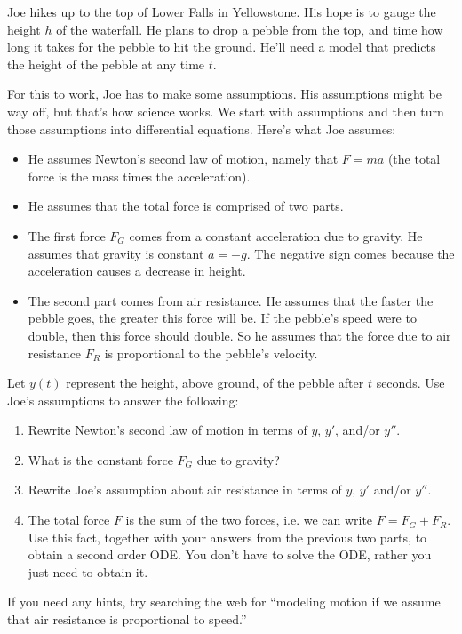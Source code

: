 \begin{problem}\label{pebble from falls}
 Joe hikes up to the top of Lower Falls in Yellowstone.  His hope is to gauge the height $h$ of the waterfall.  He plans to drop a pebble from the top, and time how long it takes for the pebble to hit the ground. He'll need a model that predicts the height of the pebble at any time $t$.

 For this to work, Joe has to make some assumptions.  His assumptions might be way off, but that's how science works. We start with assumptions and then turn those assumptions into differential equations. Here's what Joe assumes:
\begin{itemize}
 \item He assumes Newton's second law of motion, namely that $F=ma$ (the total force is the mass times the acceleration).
 \item He assumes that the total force is comprised of two parts.  
 \item The first force $F_G$ comes from a constant acceleration due to gravity. He assumes that gravity is constant $a=-g$. The negative sign comes because the acceleration causes a decrease in height.
 \item The second part comes from air resistance. He assumes that the faster the pebble goes, the greater this force will be. If the pebble's speed were to double, then this force should double.  So he assumes that the force due to air resistance $F_R$ is proportional to the pebble's velocity.
\end{itemize}
Let $y(t)$ represent the height, above ground, of the pebble after $t$ seconds. Use Joe's assumptions to answer the following:
\begin{enumerate}
 \item Rewrite Newton's second law of motion in terms of $y$, $y'$, and/or $y''$. 
 \item What is the constant force $F_G$ due to gravity?
 \item Rewrite Joe's assumption about air resistance in terms of $y$, $y'$ and/or $y''$. 
 \item The total force $F$ is the sum of the two forces, i.e. we can write $F = F_G+F_R$. Use this fact, together with your answers from the previous two parts, to obtain a second order ODE.  You don't have to solve the ODE, rather you just need to obtain it.
\end{enumerate}
If you need any hints, try searching the web for ``modeling motion if we assume that air resistance is proportional to speed.''
\end{problem}

